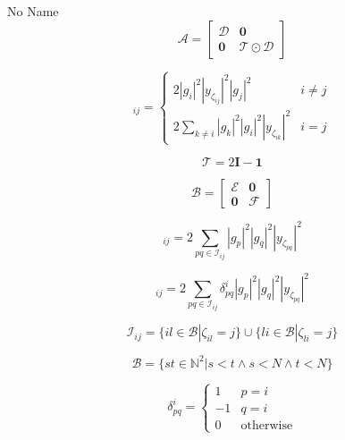 \documentclass[a4paper,10pt]{article}
\begin{document}
\begin{section}{No Name}
\begin{equation}
\boldsymbol{\mathcal{A}} =
\begin{bmatrix}
\boldsymbol{\mathcal{D}} & \boldsymbol{0}\\
\boldsymbol{0} & \boldsymbol{\mathcal{T}}\odot\boldsymbol{\mathcal{D}}
\end{bmatrix}
\end{equation}

\begin{equation}
[\boldsymbol{\mathcal{D}}]_{ij} = 
\begin{cases}
2|g_i|^2|y_{\zeta_{ij}}|^2|g_j|^2 & i\neq j\\
2\sum_{k \neq i} |g_k|^2|g_i|^2|y_{\zeta_{ik}}|^2 & i = j
\end{cases}
\end{equation}

\begin{equation}
\boldsymbol{\mathcal{T}} = 2\boldsymbol{I}-\boldsymbol{1}
\end{equation}

\begin{equation}
\boldsymbol{\mathcal{B}} =
\begin{bmatrix}
\boldsymbol{\mathcal{E}} & \boldsymbol{0}\\
\boldsymbol{0} & \boldsymbol{\mathcal{F}}
\end{bmatrix}
\end{equation}

\begin{equation}
[\boldsymbol{\mathcal{E}}]_{ij} = 2\sum_{pq\in\mathcal{I}_{ij}} |g_p|^2|g_q|^2|y_{\zeta_{pq}}|^2
\end{equation}

\begin{equation}
[\boldsymbol{\mathcal{F}}]_{ij} = 2\sum_{pq\in\mathcal{I}_{ij}} \delta_{pq}^i |g_p|^2|g_q|^2|y_{\zeta_{pq}}|^2
\end{equation}



\begin{equation}
\mathcal{I}_{ij} = \{il\in\mathcal{B}|\zeta_{il}=j\}\cup\{li\in\mathcal{B}|\zeta_{li}=j\} 
\end{equation}

\begin{equation}
\mathcal{B} = \{st\in\mathbb{N}^2|s<t \wedge s<N \wedge t<N\}
\end{equation}

\begin{equation}
\delta_{pq}^i = 
\begin{cases}
1 & p = i\\
-1 & q = i\\
0 & \textrm{otherwise}
\end{cases}
\end{equation}


\end{section}
\end{document}
